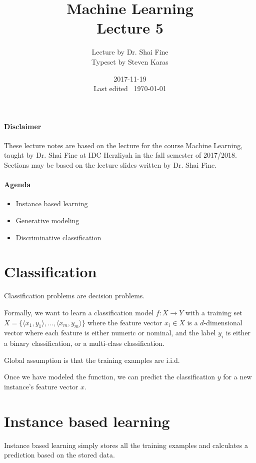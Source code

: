 \documentclass{idc_msc}
\title{Machine Learning\\\large Lecture 5}
\date{2017-11-19 \\ Last edited \currenttime\ \today}
\author{Lecture by Dr. Shai Fine\\Typeset by Steven Karas}
\begin{document}
\maketitle

\paragraph{Disclaimer}

These lecture notes are based on the lecture for the course Machine Learning, taught by Dr. Shai Fine at IDC Herzliyah in the fall semester of 2017/2018.
Sections may be based on the lecture slides written by Dr. Shai Fine.

\paragraph{Agenda}

\begin{itemize}
  \item Instance based learning
  \item Generative modeling
  \item Discriminative classification
\end{itemize}

\section{Classification}

Classification problems are decision problems.

Formally, we want to learn a classification model \(f: X \to Y\) with a training set \(X = \{\langle x_1,y_1 \rangle,\ldots,\langle x_m,y_m \rangle\}\) where the feature vector \(x_i \in X\) is a \(d\)-dimensional vector where each feature is either numeric or nominal, and the label \(y_i\) is either a binary classification, or a multi-class classification.

Global assumption is that the training examples are i.i.d.

Once we have modeled the function, we can predict the classification \(y\) for a new instance's feature vector \(x\).


\clearpage
\section{Instance based learning}

Instance based learning simply stores all the training examples and calculates a prediction based on the stored data.
\end{document}
